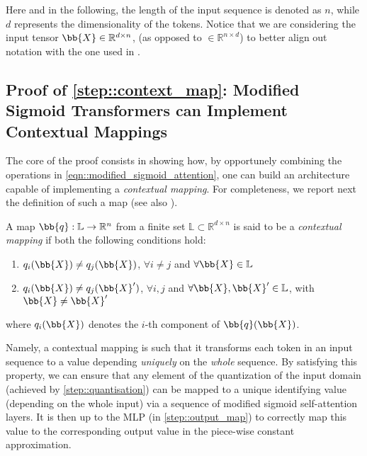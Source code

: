 Here and in the following, the length of the input sequence is denoted as $n$, while $d$ represents the dimensionality of the tokens. Notice that we are considering the input tensor $\bb{X}\in\mathbb{R}^{d\times n}$, (as opposed to $\in\mathbb{R}^{n\times d}$) to better align out notation with the one used in \cite{Yun_UAP}. 

\subsection{Proof of \cref{step::context_map}: Modified Sigmoid Transformers can Implement Contextual Mappings}
\label{sec::proof_contextual_mapping_top}
The core of the proof consists in showing how, by opportunely combining the operations in \cref{eqn::modified_sigmoid_attention}, one can build an architecture capable of implementing a \emph{contextual mapping}. For completeness, we report next the definition of such a map (see also \citet[Def.~3.1]{Yun_UAP}).
\begin{definition}
    A map $\bb{q}:\mathbb{L}\to\mathbb{R}^{n}$ from a finite set $\mathbb{L}\subset\mathbb{R}^{d\times n}$ is said to be a \emph{contextual mapping} if both the following conditions hold:
    \begin{enumerate}[label=(\roman*)]
        \item $q_i(\bb{X})\neq q_j(\bb{X})$, $\forall i\neq j$ and $\forall\bb{X}\in\mathbb{L}$
        \item $q_i(\bb{X})\neq q_j(\bb{X}')$, $\forall i,j$ and $\forall\bb{X},\bb{X}'\in\mathbb{L}$, with $\bb{X}\neq\bb{X}'$
    \end{enumerate}
    where $q_i(\bb{X})$ denotes the $i$-th component of $\bb{q}(\bb{X})$.
    \label{def::contextual_mapping}
\end{definition}
Namely, a contextual mapping is such that it transforms each token in an input sequence to a value depending \emph{uniquely} on the \emph{whole} sequence. By satisfying this property, we can ensure that any element of the quantization of the input domain (achieved by \cref{step::quantisation}) can be mapped to a unique identifying value (depending on the whole input) via a sequence of modified sigmoid self-attention layers. It is then up to the MLP (in \cref{step::output_map}) to correctly map this value to the corresponding output value in the piece-wise constant approximation.

